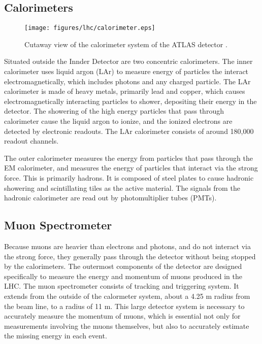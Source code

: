 \subsection{Calorimeters}
\label{sec:calo}

\begin{figure}[H]
\centering
   \texttt{[image: figures/lhc/calorimeter.eps]}
\caption{Cutaway view of the calorimeter system of the ATLAS detector \cite{}.}
\label{fig:calo}
\end{figure}

Situated outside the Innder Detector are two concentric calorimeters. The inner calorimeter uses liquid argon (LAr) to measure energy of particles the interact electromagnetically, which includes photons and any charged particle. The LAr calorimeter is made of heavy metals, primarily lead and copper, which causes electromagnetically interacting particles to shower, depositing their energy in the detector. The showering of the high energy particles that pass through calorimeter cause the liquid argon to ionize, and the ionized electrons are detected by electronic readouts. The LAr calorimeter consists of around 180,000 readout channels.  

The outer calorimeter measures the energy from particles that pass through the EM calorimeter, and measures the energy of particles that interact via the strong force. This is primarily hadrons. It is composed of steel plates to cause hadronic showering and scintillating tiles as the active material. The signals from the hadronic calorimeter are read out by photomultiplier tubes (PMTs).

\subsection{Muon Spectrometer}
\label{sec:muonSpec}

Because muons are heavier than electrons and photons, and do not interact via the strong force, they generally pass through the detector without being stopped by the calorimeters. The outermost components of the detector are designed specifically to measure the energy and momentum of muons produced in the LHC. The muon spectrometer consists of tracking and triggering system. It extends from the outside of the calormeter system, about a 4.25 m radius from the beam line, to a radius of 11 m. This large detector system is necessary to accurately measure the momentum of muons, which is essential not only for measurements involving the muons themselves, but also to accurately estimate the missing energy in each event.

